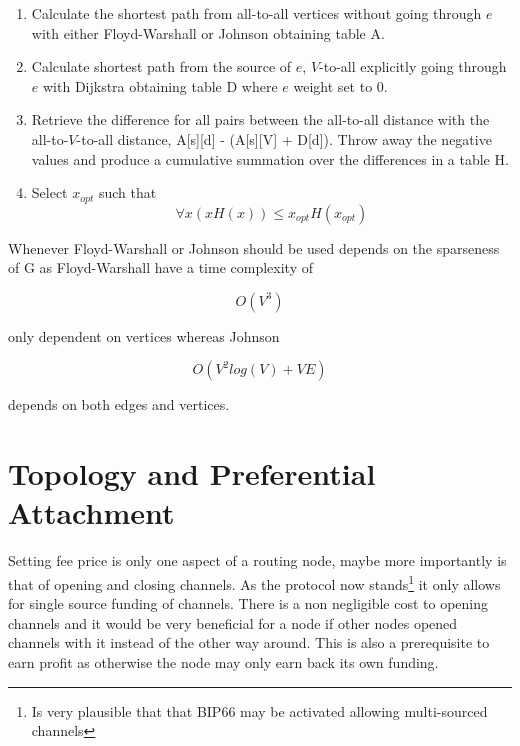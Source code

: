 \begin{enumerate}
	\item Calculate the shortest path from all-to-all vertices without going through $e$ with either Floyd-Warshall\cite{bakhtiar:floyd:warshall} or Johnson\cite{johnson:shortest:path:sparse:network} obtaining table A.
	\item Calculate shortest path from the source of $e$, $V$-to-all explicitly going through $e$ with Dijkstra obtaining table D where $e$ weight set to 0.
	\item Retrieve the difference for all pairs between the all-to-all distance with the all-to-$V$-to-all distance, A[s][d] - (A[s][V] + D[d]). Throw away the negative values and produce a cumulative summation over the differences in a table H.
	\item Select $x_{opt}$ such that \[ \forall x (x H(x)) \leq x_{opt} H(x_{opt}) \]
	
	


\end{enumerate} 

Whenever Floyd-Warshall or Johnson should be used depends on the sparseness of G as Floyd-Warshall have a time complexity of

\[ O(V^3) \]

only dependent on vertices whereas Johnson

\[ O(V^2 log(V) + VE ) \]

depends on both edges and vertices. 

\section{Topology and Preferential Attachment}

Setting fee price is only one aspect of a routing node, maybe more importantly is that of opening and closing channels.
As the protocol now stands\footnote{Is very plausible that that BIP66 may be activated allowing multi-sourced channels\cite{bip:0118:sighash:noinput}} it only allows for single source funding of channels. There is a non negligible cost to opening channels and it would be very beneficial for a node if other nodes opened channels with it instead of the other way around. This is also a prerequisite to earn profit as otherwise the node may only earn back its own funding. 

